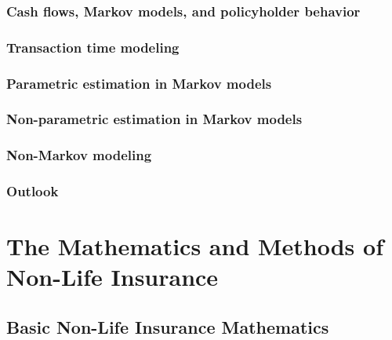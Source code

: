 \documentclass[a4paper,12pt,openany]{book}
\begin{document}
\hypertarget{cash-flows-markov-models-and-policyholder-behavior}{%
\section{Cash flows, Markov models, and policyholder behavior}\label{cash-flows-markov-models-and-policyholder-behavior}}

\hypertarget{transaction-time-modeling}{%
\section{Transaction time modeling}\label{transaction-time-modeling}}

\hypertarget{parametric-estimation-in-markov-models}{%
\section{Parametric estimation in Markov models}\label{parametric-estimation-in-markov-models}}

\hypertarget{non-parametric-estimation-in-markov-models}{%
\section{Non-parametric estimation in Markov models}\label{non-parametric-estimation-in-markov-models}}

\hypertarget{non-markov-modeling}{%
\section{Non-Markov modeling}\label{non-markov-modeling}}

\hypertarget{outlook}{%
\section{Outlook}\label{outlook}}

\hypertarget{part-the-mathematics-and-methods-of-non-life-insurance}{%
\part{The Mathematics and Methods of Non-Life Insurance}\label{part-the-mathematics-and-methods-of-non-life-insurance}}

\hypertarget{basic-non-life-insurance-mathematics}{%
\chapter{Basic Non-Life Insurance Mathematics}\label{basic-non-life-insurance-mathematics}}
\end{document}
